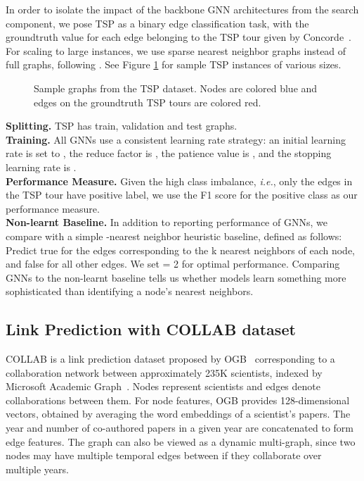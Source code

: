 \documentclass{article}
\begin{document}
In order to isolate the impact of the backbone GNN architectures from the search component, we pose TSP as a binary edge classification task,
with the groundtruth value for each edge belonging to the TSP tour given by Concorde~\cite{applegate2006concorde}.
For scaling to large instances, we use sparse  nearest neighbor graphs instead of full graphs, following \cite{khalil2017learning}.
See Figure \ref{fig:tsp} for sample TSP instances of various sizes.

\begin{figure}[!t]
	\centering
	\caption{Sample graphs from the TSP dataset. Nodes are colored blue and edges on the groundtruth TSP tours are colored red.
	}
	\label{fig:tsp}
\end{figure}

{\bf Splitting.} TSP has  train,  validation and  test graphs.\\
{\bf Training.} All GNNs use a consistent learning rate strategy: an initial learning rate is set to , the reduce factor is , the patience value is , and the stopping learning rate is .\\
{\bf Performance Measure.} Given the high class imbalance, \textit{i.e.}, only the edges in the TSP tour have positive label, we use the F1 score for the positive class as our performance measure. \\
{\bf Non-learnt Baseline.} In addition to reporting performance of GNNs, we compare with a simple -nearest neighbor heuristic baseline, defined as follows: Predict true for the edges corresponding to the k nearest neighbors of each node, and false for all other edges. 
We set  = 2 for optimal performance. 
Comparing GNNs to the non-learnt baseline tells us whether models learn something more sophisticated than identifying a node’s nearest neighbors.





\subsection{Link Prediction with COLLAB dataset}
COLLAB is a link prediction dataset proposed by OGB~\cite{hu2020ogb} corresponding to a collaboration network between approximately 235K scientists, indexed by Microsoft Academic Graph~\cite{wang2020microsoft}. 
Nodes represent scientists and edges denote collaborations between them.
For node features, OGB provides 128-dimensional vectors, obtained by averaging the word embeddings of a scientist's papers. 
The year and number of co-authored papers in a given year are concatenated to form edge features.
The graph can also be viewed as a dynamic multi-graph, since two nodes may have multiple temporal edges between if they collaborate over multiple years.
\end{document}
